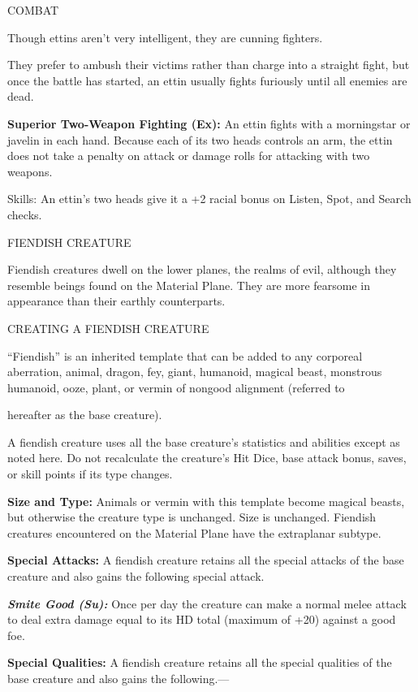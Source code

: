 \documentclass{article}
\begin{document}
COMBAT

Though ettins aren't very intelligent, they are cunning fighters.

They prefer to ambush their victims rather than charge into a straight fight, but 
once the battle has started, an ettin usually fights furiously until all enemies 
are dead.

\textbf{Superior Two-Weapon Fighting (Ex):} An ettin fights with a morningstar 
or javelin in each hand. Because each of its two heads controls an arm, the ettin 
does not take a penalty on attack or damage rolls for attacking with two weapons.

Skills: An ettin's two heads give it a +2 racial bonus on Listen, Spot, and Search 
checks.

\vspace{12pt}
{\LARGE{}FIENDISH CREATURE}

Fiendish creatures dwell on the lower planes, the realms of evil, although they 
resemble beings found on the Material Plane. They are more fearsome in appearance 
than their earthly counterparts.

\vspace{12pt}
CREATING A FIENDISH CREATURE

``Fiendish'' is an inherited template that can be added to any corporeal aberration, 
animal, dragon, fey, giant, humanoid, magical beast, monstrous humanoid, ooze, 
plant, or vermin of nongood alignment (referred to

hereafter as the base creature).

A fiendish creature uses all the base creature's statistics and abilities except 
as noted here. Do not recalculate the creature's Hit Dice, base attack bonus, saves, 
or skill points if its type changes.

\textbf{Size and Type:} Animals or vermin with this template become magical beasts, 
but otherwise the creature type is unchanged. Size is unchanged. Fiendish creatures 
encountered on the Material Plane have the extraplanar subtype.

\textbf{Special Attacks: }A fiendish creature retains all the special attacks of 
the base creature and also gains the following special attack.

\textit{\textbf{Smite Good (Su):}}\textit{ }Once per day the creature can make 
a normal melee attack to deal extra damage equal to its HD total (maximum of +20) 
against a good foe.

\textbf{Special Qualities:} A fiendish creature retains all the special qualities 
of the base creature and also gains the following.---
\end{document}
